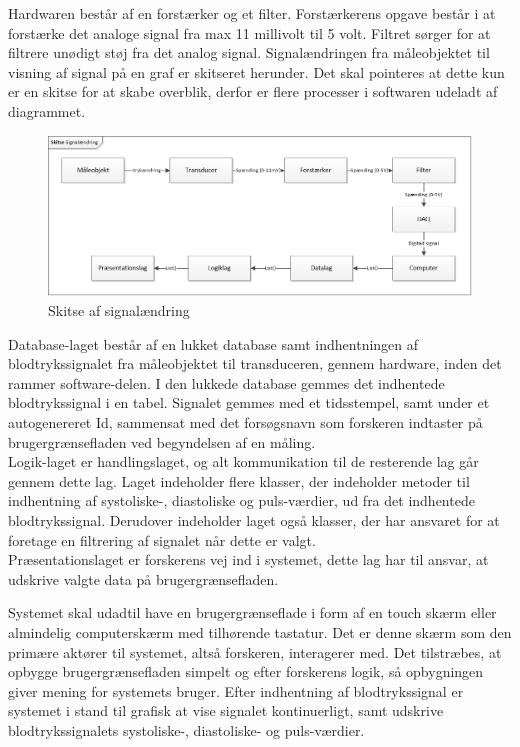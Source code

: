 Hardwaren består af en forstærker og et filter. Forstærkerens opgave består i at forstærke det analoge signal fra max 11 millivolt til 5 volt. Filtret sørger for at filtrere unødigt støj fra det analog signal. Signalændringen fra måleobjektet til visning af signal på en graf er skitseret herunder. Det skal pointeres at dette kun er en skitse for at skabe overblik, derfor er flere processer i softwaren udeladt af diagrammet. 
\begin{figure}[htb]
	\centering
	\includegraphics[width=1.0\textwidth]{Figurer/Signalandring}
	\caption{Skitse af signalændring}
\end{figure}
Database-laget består af en lukket database samt indhentningen af blodtrykssignalet fra måleobjektet til transduceren, gennem hardware, inden det rammer software-delen. I den lukkede database gemmes det indhentede blodtrykssignal i en tabel. Signalet gemmes med et tidsstempel, samt under et autogenereret Id, sammensat med det forsøgsnavn som forskeren indtaster på brugergrænsefladen ved begyndelsen af en måling. \\
Logik-laget er handlingslaget, og alt kommunikation til de resterende lag går gennem dette lag. Laget indeholder flere klasser, der indeholder metoder til indhentning af systoliske-, diastoliske og puls-værdier, ud fra det indhentede blodtrykssignal. Derudover indeholder laget også klasser, der har ansvaret for at foretage en filtrering af signalet når dette er valgt. \\ 
Præsentationslaget er forskerens vej ind i systemet, dette lag har til ansvar, at udskrive valgte data på brugergrænsefladen. 

Systemet skal udadtil have en brugergrænseflade i form af en touch skærm eller almindelig computerskærm med tilhørende tastatur. Det er denne skærm som den primære aktører til systemet, altså forskeren, interagerer med. Det tilstræbes, at opbygge brugergrænsefladen simpelt og efter forskerens logik, så opbygningen giver mening for systemets bruger. Efter indhentning af blodtrykssignal er systemet i stand til grafisk at vise signalet kontinuerligt, samt udskrive blodtrykssignalets systoliske-, diastoliske- og puls-værdier. 

